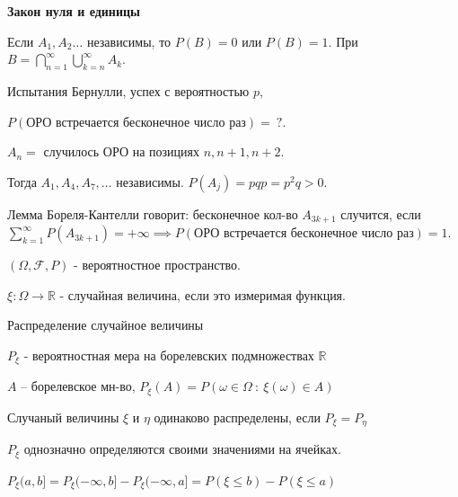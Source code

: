 \begin{theorem}
    \textbf{Закон нуля и единицы}

    Если $A_1, A_2 \ldots$ независимы, то $P(B) = 0$ или $P(B) = 1$. При $B = \bigcap_{n = 1}^{\infty} \bigcup_{k = n}^{\infty} A_k$.
\end{theorem}

\begin{example}
    Испытания Бернулли, успех с вероятностью $p$,

    $P(\text{ОРО встречается бесконечное число раз}) = \ ?$.

    $A_n = $ случилось $\text{ОРО}$ на позициях $n, n + 1, n + 2$.

    Тогда $A_1, A_4, A_7, \ldots$ независимы. $P(A_j) = pqp = p^2 q > 0$.

    Лемма Бореля-Кантелли говорит: бесконечное кол-во $A_{3k + 1}$ случится, если $\sum_{k=1}^{\infty} {P(A_{3k + 1})} = +\infty \implies P(\text{ОРО встречается бесконечное число раз}) = 1$.
\end{example}


\begin{definition}
    $(\Omega, \mathcal{F}, P)$ - вероятностное пространство.

    $\xi: \Omega \to \mathbb{R}$ - случайная величина, если
    это измеримая функция.
\end{definition}

\begin{definition}
    Распределение случайное величины

    $P_{\xi}$ - вероятностная мера на борелевских подмножествах
    $\mathbb{R}$

    $A$ -- борелевское мн-во, $P_{\xi}(A) = P(\omega \in \Omega \ : \ \xi(\omega) \in A)$
\end{definition}

\begin{definition}
    Случаный величины $\xi$ и $\eta$ одинаково распределены, если
    $P_{\xi} = P_{\eta}$
\end{definition}

\begin{remark}
    $P_{\xi}$ однозначно определяются своими значениями на ячейках.

    $P_{\xi} (a, b] = P_{\xi} (-\infty, b] - P_{\xi} (-\infty, a] =
    P(\xi \leqslant b) - P(\xi \leqslant a)$
\end{remark}

